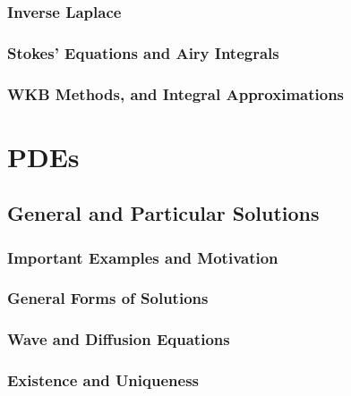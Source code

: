 \documentclass[12pt, a4paper, oneside, openright, titlepage]{book}
\begin{document}
\section{Inverse Laplace}

\section{Stokes' Equations and Airy Integrals}


\section{WKB Methods, and Integral Approximations}




\part{PDEs}


\chapter{General and Particular Solutions}

\section{Important Examples and Motivation}



\section{General Forms of Solutions}



\section{Wave and Diffusion Equations}



\section{Existence and Uniqueness}
\end{document}
